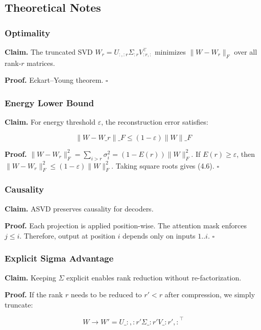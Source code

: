 \subsection{Theoretical Notes}

\subsubsection{Optimality}

\textbf{Claim.} The truncated SVD $W_r = U_{:, :r} \Sigma_{:r} V_{:r, :}^\top$ 
minimizes $\|W - W_r\|_F$ over all rank-$r$ matrices.

\textbf{Proof.} Eckart--Young theorem. $\square$

\subsubsection{Energy Lower Bound}

\textbf{Claim.} For energy threshold $\varepsilon$, the reconstruction error 
satisfies:

\[
\|W - W\_r\|\_F \leq (1 - \varepsilon) \|W\|\_F
\]

\textbf{Proof.} $\|W - W_r\|_F^2 = \sum_{i > r} \sigma_i^2 = (1 - E(r)) \|W\|_F^2$. 
If $E(r) \geq \varepsilon$, then $\|W - W_r\|_F^2 \leq (1 - \varepsilon) \|W\|_F^2$. 
Taking square roots gives (4.6). $\square$

\subsubsection{Causality}

\textbf{Claim.} ASVD preserves causality for decoders.

\textbf{Proof.} Each projection is applied position-wise. The attention mask 
enforces $j \leq i$. Therefore, output at position $i$ depends only on 
inputs $1..i$. $\square$

\subsubsection{Explicit Sigma Advantage}

\textbf{Claim.} Keeping $\Sigma$ explicit enables rank reduction without 
re-factorization.

\textbf{Proof.} If the rank $r$ needs to be reduced to $r' < r$ after 
compression, we simply truncate:

\[
W \to W' = U\_{:, :r'} \Sigma\_{:r'} V\_{:r', :}^\top
\]

